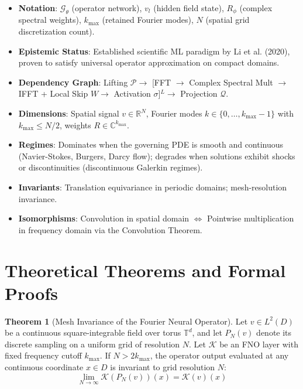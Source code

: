 \documentclass[11pt,a4paper]{article}
\theoremstyle{definition}
\newtheorem{theorem}{\textbf{Theorem}}[section]
\begin{document}
\begin{itemize}
    \item \textbf{Notation}: $\mathcal{G}_\theta$ (operator network), $v_l$ (hidden field state), $R_\phi$ (complex spectral weights), $k_{\max}$ (retained Fourier modes), $N$ (spatial grid discretization count).
    \item \textbf{Epistemic Status}: Established scientific ML paradigm by Li et al. (2020), proven to satisfy universal operator approximation on compact domains.
    \item \textbf{Dependency Graph}: Lifting $\mathcal{P} \to$ [FFT $\to$ Complex Spectral Mult $\to$ IFFT + Local Skip $W \to$ Activation $\sigma$]$^L \to$ Projection $\mathcal{Q}$.
    \item \textbf{Dimensions}: Spatial signal $v \in \mathbb{R}^N$, Fourier modes $k \in \{0, \dots, k_{\max}-1\}$ with $k_{\max} \le N/2$, weights $R \in \mathbb{C}^{k_{\max}}$.
    \item \textbf{Regimes}: Dominates when the governing PDE is smooth and continuous (Navier-Stokes, Burgers, Darcy flow); degrades when solutions exhibit shocks or discontinuities (discontinuous Galerkin regimes).
    \item \textbf{Invariants}: Translation equivariance in periodic domains; mesh-resolution invariance.
    \item \textbf{Isomorphisms}: Convolution in spatial domain $\Leftrightarrow$ Pointwise multiplication in frequency domain via the Convolution Theorem.
\end{itemize}

\section{Theoretical Theorems and Formal Proofs}

\begin{theorem}[Mesh Invariance of the Fourier Neural Operator]
Let $v \in L^2(D)$ be a continuous square-integrable field over torus $\mathbb{T}^d$, and let $P_N(v)$ denote its discrete sampling on a uniform grid of resolution $N$. Let $\mathcal{K}$ be an FNO layer with fixed frequency cutoff $k_{\max}$. If $N > 2 k_{\max}$, the operator output evaluated at any continuous coordinate $x \in D$ is invariant to grid resolution $N$:
{\boldmath
\begin{equation}
\lim_{N \to \infty} \mathcal{K}(P_N(v))(x) = \mathcal{K}(v)(x)
\end{equation}
}
\end{theorem}
\end{document}
